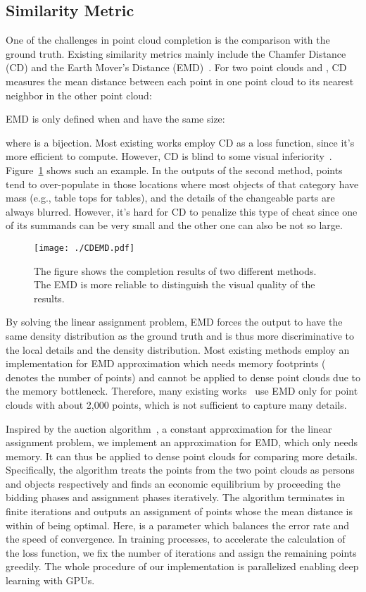 \documentclass[letterpaper]{article} \usepackage{aaai20}  \usepackage{times}  \usepackage{helvet} \usepackage{courier}  \usepackage[hyphens]{url}  \usepackage{graphicx} \urlstyle{rm} \def\UrlFont{\rm}  \usepackage{graphicx}  \frenchspacing  \setlength{\pdfpagewidth}{8.5in}  \setlength{\pdfpageheight}{11in}  \usepackage{amsmath}
\begin{document}
\subsection{Similarity Metric} 
One of the challenges in point cloud completion is the comparison with the ground truth. Existing similarity metrics mainly include the Chamfer Distance (CD) and the Earth Mover's Distance (EMD)~\cite{fan2017point}. For two point clouds  and , CD measures the mean distance between each point in one point cloud to its nearest neighbor in the other point cloud:
{\small

}
EMD is only defined when  and  have the same size: 
{\small

}
where  is a bijection. Most existing works employ CD as a loss function, since it's more efficient to compute. However, CD is blind to some visual inferiority~\cite{achlioptas2017learning}. Figure~\ref{fig:CDEMD} shows such an example. In the outputs of the second method, points tend to over-populate in those locations where most objects of that category have mass (e.g., table tops for tables), and the details of the changeable parts are always blurred. However, it's hard for CD to penalize this type of cheat since one of its summands can be very small and the other one can also be not so large. 

\begin{figure}[t]
  \centering
  \texttt{[image: ./CDEMD.pdf]}
  \caption{The figure shows the completion results of two different methods. The EMD is more reliable to distinguish the visual quality of the results.}
  \label{fig:CDEMD}
\end{figure}


By solving the linear assignment problem, EMD forces the output to have the same density distribution as the ground truth and is thus more discriminative to the local details and the density distribution. Most existing methods employ an implementation for EMD approximation which needs  memory footprints ( denotes the number of points) and cannot be applied to dense point clouds due to the memory bottleneck. Therefore, many existing works~\cite{yuan2018pcn,achlioptas2017learning,wang20193dn} use EMD only for point clouds with about 2,000 points, which is not sufficient to capture many details.

Inspired by the auction algorithm~\cite{bertsekas1992auction}, a constant approximation for the linear assignment problem, we implement an approximation for EMD, which only needs  memory. It can thus be applied to dense point clouds for comparing more details. Specifically, the algorithm treats the points from the two point clouds as persons and objects respectively and finds an economic equilibrium by proceeding the bidding phases and assignment phases iteratively. The algorithm terminates in finite iterations and outputs an assignment of points whose the mean distance is within  of being optimal. Here,  is a parameter which balances the error rate and the speed of convergence. In training processes, to accelerate the calculation of the loss function, we fix the number of iterations and assign the remaining points greedily. The whole procedure of our implementation is parallelized enabling deep learning with GPUs. 
\end{document}
